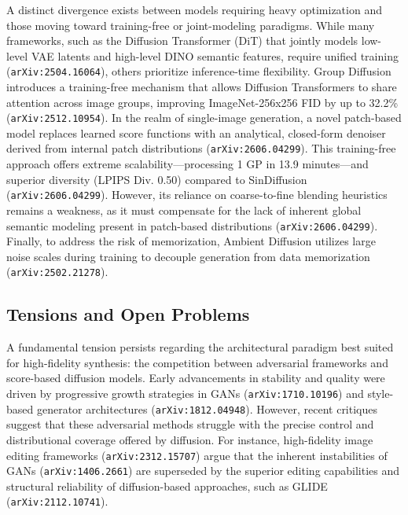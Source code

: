 \documentclass[11pt]{article}
\begin{document}
A distinct divergence exists between models requiring heavy optimization and those moving toward training-free or joint-modeling paradigms. While many frameworks, such as the Diffusion Transformer (DiT) that jointly models low-level VAE latents and high-level DINO semantic features, require unified training (\texttt{arXiv:2504.16064}), others prioritize inference-time flexibility. Group Diffusion introduces a training-free mechanism that allows Diffusion Transformers to share attention across image groups, improving ImageNet-256x256 FID by up to 32.2\% (\texttt{arXiv:2512.10954}). In the realm of single-image generation, a novel patch-based model replaces learned score functions with an analytical, closed-form denoiser derived from internal patch distributions (\texttt{arXiv:2606.04299}). This training-free approach offers extreme scalability—processing 1 GP in 13.9 minutes—and superior diversity (LPIPS Div. 0.50) compared to SinDiffusion (\texttt{arXiv:2606.04299}). However, its reliance on coarse-to-fine blending heuristics remains a weakness, as it must compensate for the lack of inherent global semantic modeling present in patch-based distributions (\texttt{arXiv:2606.04299}). Finally, to address the risk of memorization, Ambient Diffusion utilizes large noise scales during training to decouple generation from data memorization (\texttt{arXiv:2502.21278}).

\subsection{Tensions and Open Problems}

A fundamental tension persists regarding the architectural paradigm best suited for high-fidelity synthesis: the competition between adversarial frameworks and score-based diffusion models. Early advancements in stability and quality were driven by progressive growth strategies in GANs (\texttt{arXiv:1710.10196}) and style-based generator architectures (\texttt{arXiv:1812.04948}). However, recent critiques suggest that these adversarial methods struggle with the precise control and distributional coverage offered by diffusion. For instance, high-fidelity image editing frameworks (\texttt{arXiv:2312.15707}) argue that the inherent instabilities of GANs (\texttt{arXiv:1406.2661}) are superseded by the superior editing capabilities and structural reliability of diffusion-based approaches, such as GLIDE (\texttt{arXiv:2112.10741}).
\end{document}
